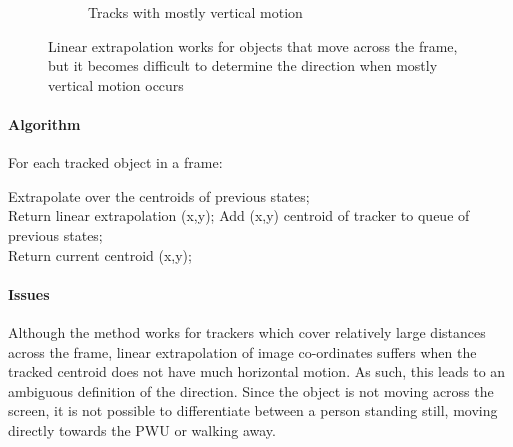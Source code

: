 \begin{figure}[ht]
\begin{subfigure}[b]{.45\textwidth}
        \caption{Tracks with mostly vertical motion}
    \end{subfigure}
    \vspace{-1\baselineskip}
    \begin{center}
        \caption{Linear extrapolation works for objects that move across the frame, but it becomes difficult to determine the direction when mostly vertical motion occurs}
        \label{fig:linExProblem}
    \end{center}
    \vspace{-2\baselineskip}
\end{figure}

\paragraph{Algorithm} For each tracked object in a frame:

\begin{algorithm}[ht] 
    
    {
        {
            {
                Extrapolate over the centroids of previous states; \\
                Return linear extrapolation (x,y);
            }
            {
                Add (x,y) centroid of tracker to queue of previous states;    \\
                Return current centroid (x,y);
            }
        }
    
    }
\end{algorithm}

\paragraph{Issues} Although the method works for trackers which cover relatively large distances across the frame, linear extrapolation of image co-ordinates suffers when the tracked centroid does not have much horizontal motion. As such, this leads to an ambiguous definition of the direction. Since the object is not moving across the screen, it is not possible to differentiate between a person standing still, moving directly towards the PWU or walking away.

